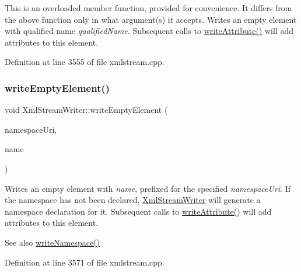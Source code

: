 This is an overloaded member function, provided for convenience. It differs from the above function only in what argument(s) it accepts. Writes an empty element with qualified name {\itshape qualified\+Name}. Subsequent calls to \hyperlink{class_xml_stream_writer_a685d12dc71870e20e835085b6326787b}{write\+Attribute()} will add attributes to this element. 

Definition at line 3555 of file xmlstream.\+cpp.

\mbox{\label{class_xml_stream_writer_ad366e97aa66482054f029843bc982586}} 
\subsubsection{\texorpdfstring{write\+Empty\+Element()}{writeEmptyElement()}\hspace{0.1cm}{\footnotesize\ttfamily [2/2]}}
{\footnotesize\ttfamily void Xml\+Stream\+Writer\+::write\+Empty\+Element (\begin{DoxyParamCaption}\item[{const Q\+String \&}]{namespace\+Uri,  }\item[{const Q\+String \&}]{name }\end{DoxyParamCaption})}

Writes an empty element with {\itshape name}, prefixed for the specified {\itshape namespace\+Uri}. If the namespace has not been declared, \hyperlink{class_xml_stream_writer}{Xml\+Stream\+Writer} will generate a namespace declaration for it. Subsequent calls to \hyperlink{class_xml_stream_writer_a685d12dc71870e20e835085b6326787b}{write\+Attribute()} will add attributes to this element.

\begin{DoxySeeAlso}{See also}
\hyperlink{class_xml_stream_writer_ae04b7c7035435fd98cc625257776e732}{write\+Namespace()} 
\end{DoxySeeAlso}


Definition at line 3571 of file xmlstream.\+cpp.

\mbox{\label{class_xml_stream_writer_a4fa078ed52892cec544e890efb1c3b50}} 
